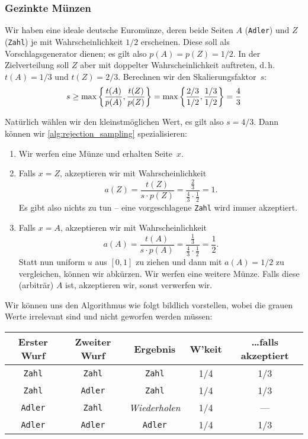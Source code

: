 \subsubsection{Gezinkte Münzen}
Wir haben eine ideale deutsche Euromünze, deren beide Seiten $A$ (\texttt{Adler}) und $Z$ (\texttt{Zahl}) je mit Wahrscheinlichkeit $1/2$ erscheinen.
Diese soll als Vorschlagsgenerator dienen; es gilt also $p(A) = p(Z) = 1/2$.
In der Zielverteilung soll $Z$ aber mit doppelter Wahrscheinlichkeit auftreten, d.\,h. $t(A) = 1/3$ und $t(Z) = 2/3$.
Berechnen wir den Skalierungsfaktor~$s$:
\begin{align}
    s \ge \max\left\{ \frac{t(A)}{p(A)}, \frac{t(Z)}{p(Z)} \right\} = \max\left\{ \frac{2/3}{1/2}, \frac{1/3}{1/2} \right\} = \frac{4}{3}
\end{align}

\noindent
Natürlich wählen wir den kleinstmöglichen Wert, es gilt also $s=4/3$. Dann können wir \cref{alg:rejection_sampling} spezialisieren:
\begin{enumerate}
    \item Wir werfen eine Münze und erhalten Seite~$x$.
    \item Falls $x = Z$, akzeptieren wir mit Wahrscheinlichkeit
          $$
              a(Z) = \frac{t(Z)}{s \cdot p(Z)} = \frac{\frac 2 3}{\frac 4 3 \cdot \frac 1 2} = 1.
          $$
          Es gibt also nichts zu tun -- eine vorgeschlagene \texttt{Zahl} wird immer akzeptiert.
    \item Falls $x = A$, akzeptieren wir mit Wahrscheinlichkeit
          $$
              a(A) = \frac{t(A)}{s \cdot p(A)} = \frac{\frac 1 3}{\frac 4 3 \cdot \frac 1 2} = \frac 1 2.
          $$
          Statt nun uniform $u$ aus $[0, 1]$ zu ziehen und dann mit $a(A) = 1/2$ zu vergleichen, können wir abkürzen.
          Wir werfen eine weitere Münze. Falls diese (arbiträr) $A$ ist, akzeptieren wir, sonst verwerfen wir.
\end{enumerate}

Wir können uns den Algorithmus wie folgt bildlich vorstellen, wobei die grauen Werte irrelevant sind und nicht geworfen werden müssen:
\begin{center}
    \begin{tabular}{c|c|c||c|c}
        Erster Wurf    & Zweiter Wurf                         & Ergebnis           & W'keit & \ldots falls akzeptiert \\\hline
        \texttt{Zahl}  & \textcolor{black!50}{\texttt{Zahl}}  & \texttt{Zahl}      & 1/4    & 1/3                     \\
        \texttt{Zahl}  & \textcolor{black!50}{\texttt{Adler}} & \texttt{Zahl}      & 1/4    & 1/3                     \\\hline
        \texttt{Adler} & \texttt{Zahl}                        & \emph{Wiederholen} & 1/4    & ---                     \\\hline
        \texttt{Adler} & \texttt{Adler}                       & \texttt{Adler}     & 1/4    & 1/3
    \end{tabular}
\end{center}


